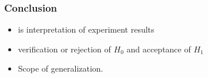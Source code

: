 \subsubsection{Conclusion}

\begin{itemize}
	\item is interpretation of experiment results
	\item verification or rejection of $H_0$ and acceptance of $H_1$
	\item Scope of generalization.
\end{itemize}